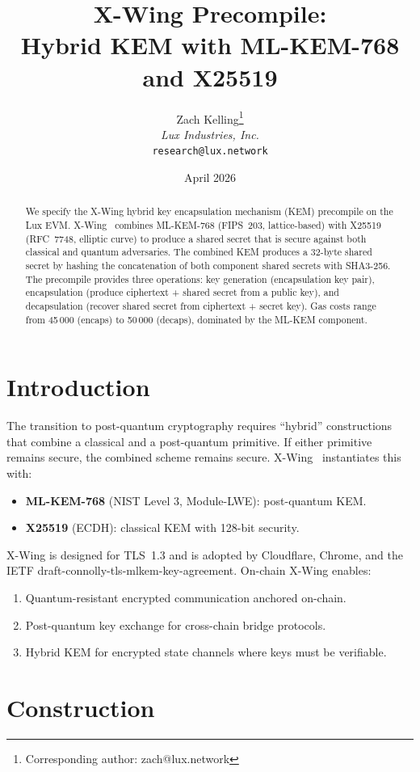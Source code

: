 \documentclass[11pt,a4paper]{article}
\title{X-Wing Precompile:\\Hybrid KEM with ML-KEM-768 and X25519}
\author{
Zach Kelling\thanks{Corresponding author: zach@lux.network}\\
\textit{Lux Industries, Inc.}\\
\texttt{research@lux.network}
}
\date{April 2026}
\begin{document}
\luxcoverpage

\begin{abstract}
We specify the X-Wing hybrid key encapsulation mechanism (KEM) precompile on the
Lux EVM. X-Wing~\cite{xwing} combines ML-KEM-768 (FIPS~203, lattice-based) with
X25519 (RFC~7748, elliptic curve) to produce a shared secret that is secure against
both classical and quantum adversaries. The combined KEM produces a 32-byte shared
secret by hashing the concatenation of both component shared secrets with SHA3-256.
The precompile provides three operations: key generation (encapsulation key pair),
encapsulation (produce ciphertext + shared secret from a public key), and
decapsulation (recover shared secret from ciphertext + secret key). Gas costs
range from 45\,000 (encaps) to 50\,000 (decaps), dominated by the ML-KEM component.
\end{abstract}

\section{Introduction}

The transition to post-quantum cryptography requires ``hybrid'' constructions
that combine a classical and a post-quantum primitive. If either primitive
remains secure, the combined scheme remains secure. X-Wing~\cite{xwing}
instantiates this with:

\begin{itemize}
  \item \textbf{ML-KEM-768} (NIST Level 3, Module-LWE): post-quantum KEM.
  \item \textbf{X25519} (ECDH): classical KEM with 128-bit security.
\end{itemize}

X-Wing is designed for TLS~1.3 and is adopted by Cloudflare, Chrome, and the
IETF draft-connolly-tls-mlkem-key-agreement. On-chain X-Wing enables:

\begin{enumerate}[label=(\roman*)]
  \item Quantum-resistant encrypted communication anchored on-chain.
  \item Post-quantum key exchange for cross-chain bridge protocols.
  \item Hybrid KEM for encrypted state channels where keys must be verifiable.
\end{enumerate}

\section{Construction}
\end{document}
